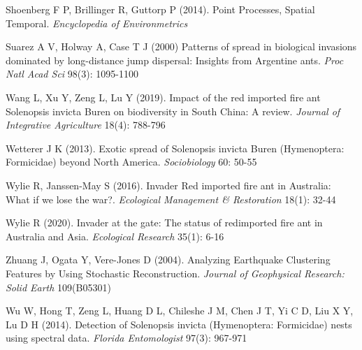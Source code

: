 \documentclass[11pt,a4paper]{article}
\begin{document}
\begin{thebibliography}{99}
 Shoenberg F P, Brillinger R, Guttorp P (2014). Point Processes, Spatial Temporal. \textit{Encyclopedia of Environmetrics}

 Suarez A V, Holway A, Case T J (2000) Patterns of spread in biological invasions dominated by long-distance jump dispersal: Insights from Argentine ants. \textit{Proc Natl Acad Sci} 98(3): 1095-1100

 Wang L, Xu Y, Zeng L, Lu Y (2019). Impact of the red imported fire ant Solenopsis invicta Buren on biodiversity in South China: A review. \textit{Journal of Integrative Agriculture} 18(4): 788-796

 Wetterer J K (2013). Exotic spread of Solenopsis invicta Buren (Hymenoptera: Formicidae) beyond North America. \textit{Sociobiology} 60: 50-55

 Wylie R, Janssen-May S (2016). Invader  Red imported fire ant in Australia:  What if we lose the war?. \textit{Ecological Management & Restoration} 18(1): 32-44

 Wylie R (2020). Invader at the gate: The status of redimported fire ant in Australia and Asia. \textit{Ecological Research} 35(1): 6-16

 Zhuang J, Ogata Y, Vere-Jones D (2004). Analyzing Earthquake Clustering Features by Using Stochastic Reconstruction. \textit{Journal of Geophysical Research: Solid Earth} 109(B05301)

 Wu W, Hong T, Zeng L, Huang D L, Chileshe J M, Chen J T, Yi C D, Liu X Y, Lu D H (2014). Detection of Solenopsis invicta (Hymenoptera: Formicidae) nests using spectral data. \textit{Florida Entomologist} 97(3): 967-971

\end{thebibliography}
\end{document}

